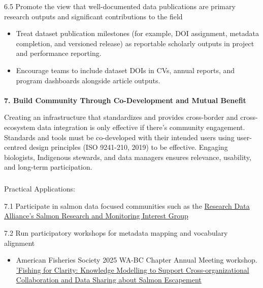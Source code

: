 \documentclass[
  letterpaper,
  DIV=11,
  numbers=noendperiod]{scrartcl}
\makeatletter
\let\oldparagraph\paragraph
\renewcommand{\paragraph}{
    \@ifstar
      \xxxParagraphStar
      \xxxParagraphNoStar
  }
\newcommand{\xxxParagraphStar}[1]{\oldparagraph*{#1}\mbox{}}
\newcommand{\xxxParagraphNoStar}[1]{\oldparagraph{#1}\mbox{}}
\let\oldsubparagraph\subparagraph
\renewcommand{\subparagraph}{
    \@ifstar
      \xxxSubParagraphStar
      \xxxSubParagraphNoStar
  }
\newcommand{\xxxSubParagraphStar}[1]{\oldsubparagraph*{#1}\mbox{}}
\newcommand{\xxxSubParagraphNoStar}[1]{\oldsubparagraph{#1}\mbox{}}
\providecommand{\tightlist}{%
  \setlength{\itemsep}{0pt}\setlength{\parskip}{0pt}}
\makeatother
\begin{document}
6.5 Promote the view that well-documented data publications are primary
research outputs and significant contributions to the field

\begin{itemize}
\tightlist
\item
  Treat dataset publication milestones (for example, DOI assignment,
  metadata completion, and versioned release) as reportable scholarly
  outputs in project and performance reporting.
\item
  Encourage teams to include dataset DOIs in CVs, annual reports, and
  program dashboards alongside article outputs.
\end{itemize}

\paragraph{\texorpdfstring{\textbf{7. Build Community Through
Co-Development and Mutual
Benefit}}{7. Build Community Through Co-Development and Mutual Benefit}}\label{build-community-through-co-development-and-mutual-benefit}

Creating an infrastructure that standardizes and provides cross-border
and cross-ecosystem data integration is only effective if there's
community engagement. Standards and tools must be co-developed with
their intended users using user-centred design principles ({ISO}
9241-210, 2019) to be effective. Engaging biologists, Indigenous
stewards, and data managers ensures relevance, usability, and long-term
participation.

\subparagraph{Practical Applications:}\label{practical-applications-6}

7.1 Participate in salmon data focused communities such as the
\href{https://www.rd-alliance.org/groups/salmon-research-and-monitoring-ig/}{Research
Data Alliance's Salmon Research and Monitoring Interest Group}~

7.2 Run participatory workshops for metadata mapping and vocabulary
alignment

\begin{itemize}
\tightlist
\item
  American Fisheries Society 2025 WA-BC Chapter Annual Meeting workshop.
  \href{https://pnamp.org/event/workshop-fishing-for-clarity-knowledge-modeling-to-support-cross-organizational-collaboration-and-data-sharing-about-salmon-escapement/}{'Fishing
  for Clarity: Knowledge Modelling to Support Cross-organizational
  Collaboration and Data Sharing about Salmon Escapement}
\end{itemize}
\end{document}
